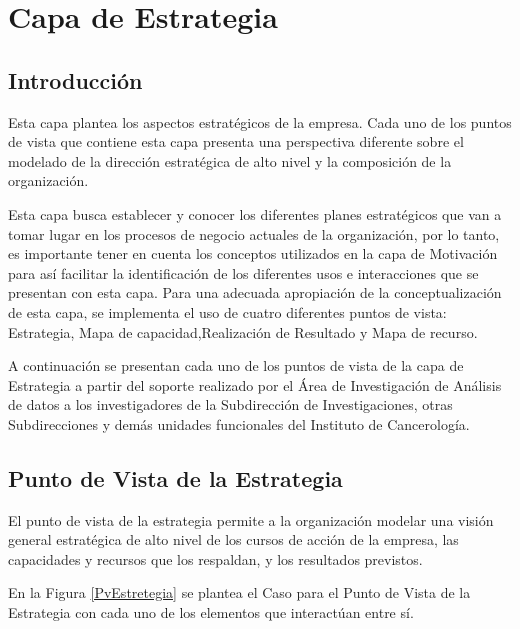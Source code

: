 \chapter{Capa de Estrategia}
\section{Introducción}

Esta capa plantea los aspectos estratégicos de la empresa. Cada uno de los puntos de vista que contiene esta capa presenta una perspectiva diferente sobre el modelado de la dirección estratégica de alto nivel y la composición de la organización\cite{ArchiMate3.0.1}. 

Esta capa  busca establecer y conocer los diferentes planes estratégicos que van a tomar lugar en los procesos de negocio actuales de la organización, por lo tanto, es importante tener en cuenta los conceptos utilizados en la capa de Motivación para así facilitar la identificación de los diferentes usos e interacciones que se presentan con esta capa. Para una adecuada apropiación de la conceptualización de esta capa, se implementa el uso de cuatro diferentes puntos de vista: Estrategia, Mapa de capacidad,Realización de Resultado y Mapa de recurso.

A continuación se presentan cada uno de los puntos de vista de la capa de Estrategia  a partir del soporte realizado por el Área de Investigación de Análisis de datos a los investigadores de la Subdirección de Investigaciones, otras Subdirecciones y demás unidades funcionales del Instituto de Cancerología.

\newpage
\section{Punto de Vista de la Estrategia}

El punto de vista de la estrategia permite a la organización modelar una visión general estratégica de alto nivel de los cursos de acción de la empresa, las capacidades y recursos que los respaldan, y los resultados previstos\cite{ArchiMate3.0.1}. 

En la Figura \ref{PvEstretegia} se plantea el Caso para el Punto de Vista de la Estrategia con cada uno de los elementos que interactúan entre sí. 

